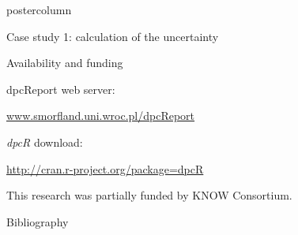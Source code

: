 \documentclass[final]{beamer}\usepackage[]{graphicx}\usepackage[]{color}
\begin{document}
\begin{frame}
\begin{columns}
\begin{column}{.54\textwidth}
\begin{beamercolorbox}[center,wd=\textwidth]{postercolumn}
\begin{minipage}[T]{.95\textwidth}
{\begin{block}{Case study 1: calculation of the uncertainty}
    \end{block}
    \vfill
    

    
        \begin{block}{Availability and funding}
        \footnotesize{
      dpcReport web server: 
      
      \url{www.smorfland.uni.wroc.pl/dpcReport}
      
      \textit{dpcR} download:
      
      \url{http://cran.r-project.org/package=dpcR}
      
        }
        
      
        
        This research was partially funded by KNOW Consortium.
    \end{block}
    \vfill 
     
     
    \begin{block}{Bibliography}
    \tiny{
      
      
    }
    \end{block}
    \vfill
            }
        \end{minipage}
      \end{beamercolorbox}
    \end{column}
  \end{columns}  
\end{frame}
\end{document}
